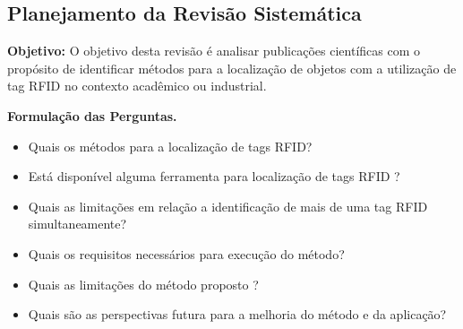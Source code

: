         \subsection{ Planejamento da Revisão Sistemática}
            \par
\textbf{Objetivo: }O objetivo desta revisão é analisar publicações científicas com o propósito de  identificar métodos para a localização de objetos com a utilização de tag RFID no contexto acadêmico ou industrial.
            
            \par
            \textbf{Formulação das Perguntas.}
            
            \begin{itemize}
              \item Quais os métodos para a localização de tags RFID?
              \item Está disponível alguma ferramenta para localização de tags RFID ?
              \item Quais as limitações em relação a identificação de mais de uma tag RFID simultaneamente?
              \item Quais os requisitos necessários para execução do método?
              \item Quais as limitações do método proposto ?
              \item Quais são as perspectivas futura para a melhoria do método e da aplicação?

            \end{itemize}
            
